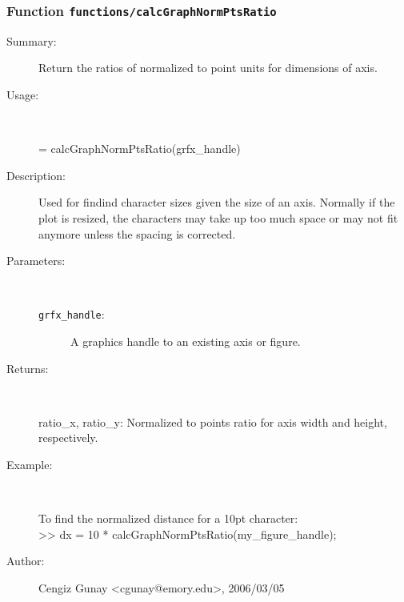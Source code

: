 \subsubsection[Function \texttt{calcGraphNormPtsRatio}]{Function \texttt{functions/calcGraphNormPtsRatio}}%
%
\label{ref_functions__calcGraphNormPtsRatio}%
\hypertarget{ref_functions__calcGraphNormPtsRatio}{}%
\begin{description}
\item[Summary:]Return the ratios of normalized to point units for dimensions of axis.
%
\item[Usage:]~%
\begin{lyxcode}%
[ratio\_x, ratio\_y] = calcGraphNormPtsRatio(grfx\_handle)
%
\end{lyxcode}%
%
\item[Description:]%
Used for findind character sizes given the size of an axis. Normally if the plot
 is resized, the characters may take up too much space or may not fit anymore unless
 the spacing is corrected.
\item[Parameters:]~
\begin{description}%
\item[\texttt{grfx\_handle}:]
 A graphics handle to an existing axis or figure.
\end{description}%
%
\item[Returns:
]~

 	ratio\_x, ratio\_y: Normalized to points ratio for axis width and height, respectively.
%
\item[Example:]~
\begin{lyxcode} To find the normalized distance for a 10pt character:
\\%
 >> dx = 10 * calcGraphNormPtsRatio(my\_figure\_handle);
\\%
\end{lyxcode}
%
%
\item[Author:]%
Cengiz Gunay <cgunay@emory.edu>, 2006/03/05
%
\end{description}
\methodline%
